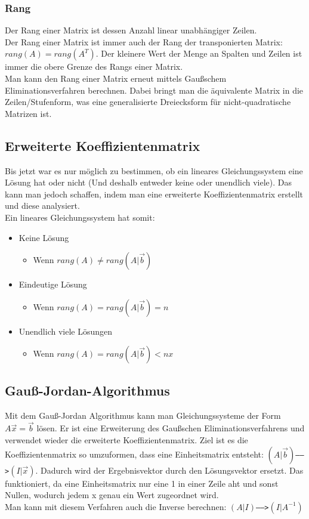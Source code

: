 \documentclass{article}
\begin{document}
	\subsubsection{Rang}
	Der Rang einer Matrix ist dessen Anzahl linear unabhängiger Zeilen. \\
	Der Rang einer Matrix ist immer auch der Rang der transponierten Matrix: $rang(A)=rang(A^T)$. Der kleinere Wert der Menge an Spalten und Zeilen ist immer die obere Grenze des Rangs einer Matrix. \\
	Man kann den Rang einer Matrix erneut mittels Gaußschem Eliminationsverfahren berechnen. Dabei bringt man die äquivalente Matrix in die Zeilen/Stufenform, was eine generalisierte Dreiecksform für nicht-quadratische Matrizen ist.
	\subsection{Erweiterte Koeffizientenmatrix}
	Bis jetzt war es nur möglich zu bestimmen, ob ein lineares Gleichungssystem eine Lösung hat oder nicht (Und deshalb entweder keine oder unendlich viele). Das kann man jedoch schaffen, indem man eine erweiterte Koeffizientenmatrix erstellt und diese analysiert. \\
	Ein lineares Gleichungssystem hat somit:
	\begin{itemize}
		\item{Keine Lösung}
		\begin{itemize}
			\item{Wenn $rang(A)\ne rang(A|\vec{b})$}
		\end{itemize}
		\item{Eindeutige Lösung}
		\begin{itemize}
			\item{Wenn $rang(A)=rang(A|\vec{b})=n$}
		\end{itemize}
		\item{Unendlich viele Lösungen}
		\begin{itemize}
			\item{Wenn $rang(A)=rang(A|\vec{b})<nx$}
		\end{itemize}
	\end{itemize}
	\subsection{Gauß-Jordan-Algorithmus}
	Mit dem Gauß-Jordan Algorithmus kann man Gleichungssysteme der Form $A \vec{x}=\vec{b}$ lösen. Er ist eine Erweiterung des Gaußschen Eliminationsverfahrens und verwendet wieder die erweiterte Koeffizientenmatrix. Ziel ist es die Koeffizientenmatrix so umzuformen, dass eine Einheitsmatrix entsteht: $(A|\vec{b})$\texttt{----->}$(I|\vec{x})$. Dadurch wird der Ergebnisvektor durch den Lösungsvektor ersetzt. Das funktioniert, da eine Einheitsmatrix nur eine 1 in einer Zeile aht und sonst Nullen, wodurch jedem x genau ein Wert zugeordnet wird. \\
	Man kann mit diesem Verfahren auch die Inverse berechnen: $(A|I)$\texttt{----->}$(I|A^{-1})$
\end{document}
